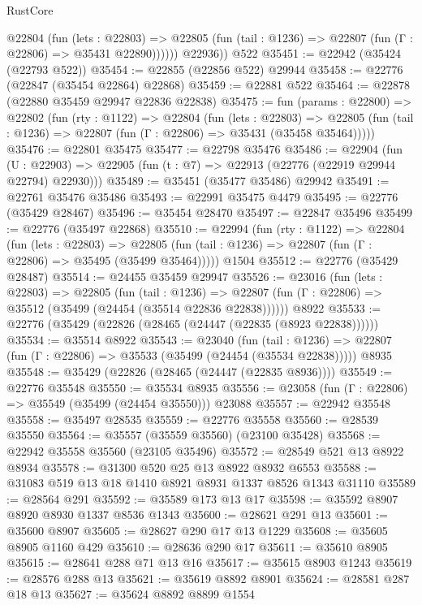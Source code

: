 \begin{lexlean}{RustCore}
\begin{coremodule}
            @22804
              (fun (lets : @22803) =>
              @22805 (fun (tail : @1236) => @22807 (fun (Γ : @22806) => @35431 @22890))))))
        @22936))
    @522
@35451 := @22942 (@35424 (@22793 @522))
@35454 := @22855 (@22856 @522) @29944
@35458 := @22776 (@22847 (@35454 @22864) @22868)
@35459 := @22881 @522
@35464 := @22878 (@22880 @35459 @29947 @22836 @22838)
@35475 := fun (params : @22800) =>
  @22802
    (fun (rty : @1122) =>
    @22804
      (fun (lets : @22803) =>
      @22805 (fun (tail : @1236) => @22807 (fun (Γ : @22806) => @35431 (@35458 @35464)))))
@35476 := @22801 @35475
@35477 := @22798 @35476
@35486 := @22904
    (fun (U : @22903) => @22905 (fun (t : @7) => @22913 (@22776 (@22919 @29944 @22794) @22930)))
@35489 := @35451 (@35477 @35486) @29942
@35491 := @22761 @35476 @35486
@35493 := @22991 @35475 @4479
@35495 := @22776 (@35429 @28467)
@35496 := @35454 @28470
@35497 := @22847 @35496
@35499 := @22776 (@35497 @22868)
@35510 := @22994
    (fun (rty : @1122) =>
    @22804
      (fun (lets : @22803) =>
      @22805 (fun (tail : @1236) => @22807 (fun (Γ : @22806) => @35495 (@35499 @35464)))))
    @1504
@35512 := @22776 (@35429 @28487)
@35514 := @24455 @35459 @29947
@35526 := @23016
    (fun (lets : @22803) =>
    @22805
      (fun (tail : @1236) =>
      @22807 (fun (Γ : @22806) => @35512 (@35499 (@24454 (@35514 @22836 @22838))))))
    @8922
@35533 := @22776 (@35429 (@22826 (@28465 (@24447 (@22835 (@8923 @22838))))))
@35534 := @35514 @8922
@35543 := @23040
    (fun (tail : @1236) => @22807 (fun (Γ : @22806) => @35533 (@35499 (@24454 (@35534 @22838)))))
    @8935
@35548 := @35429 (@22826 (@28465 (@24447 (@22835 @8936))))
@35549 := @22776 @35548
@35550 := @35534 @8935
@35556 := @23058 (fun (Γ : @22806) => @35549 (@35499 (@24454 @35550))) @23088
@35557 := @22942 @35548
@35558 := @35497 @28535
@35559 := @22776 @35558
@35560 := @28539 @35550
@35564 := @35557 (@35559 @35560) (@23100 @35428)
@35568 := @22942 @35558 @35560 (@23105 @35496)
@35572 := @28549 @521 @13 @8922 @8934
@35578 := @31300 @520 @25 @13 @8922 @8932 @6553
@35588 := @31083 @519 @13 @18 @1410 @8921 @8931 @1337 @8526 @1343 @31110
@35589 := @28564 @291
@35592 := @35589 @173 @13 @17
@35598 := @35592 @8907 @8920 @8930 @1337 @8536 @1343
@35600 := @28621 @291 @13
@35601 := @35600 @8907
@35605 := @28627 @290 @17 @13 @1229
@35608 := @35605 @8905 @1160 @429
@35610 := @28636 @290 @17
@35611 := @35610 @8905
@35615 := @28641 @288 @71 @13 @16
@35617 := @35615 @8903 @1243
@35619 := @28576 @288 @13
@35621 := @35619 @8892 @8901
@35624 := @28581 @287 @18 @13
@35627 := @35624 @8892 @8899 @1554

\end{coremodule}
\end{lexlean}
